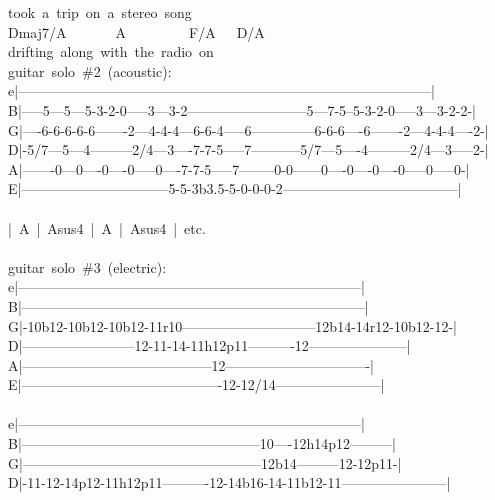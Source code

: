 {took\ a\ trip\ on\ a\ stereo\ song\\
Dmaj7/A\ \ \ \ \ \ \ A\ \ \ \ \ \ \ \ \ F/A\ \ \ D/A\\
drifting\ along\ with\ the\ radio\ on\\
guitar\ solo\ \#2\ (acoustic):\\
e|-----------------------------------------------------------------------------------------|\\
B|-----5---5---5-3-2-0-----3---3-2--------------------------5---7-5--5-3-2-0-----3---3-2-2-|\\
G|----6-6-6-6-6-------2---4-4-4---6-6-4-----6--------------6-6-6----6-------2---4-4-4----2-|\\
D|-5/7---5---4---------2/4---3----7-7-5-----7-----------5/7---5----4---------2/4---3-----2-|\\
A|-------0---0----0----0-----0----7-7-5-----7--------0-0------0----0----0----0-----0-----0-|\\
E|--------------------------------5-5-3b3.5-5-0-0-0-2--------------------------------------|\\
\\
|\ A\ |\ Asus4\ |\ A\ |\ Asus4\ |\ etc.\\
\\
guitar\ solo\ \#3\ (electric):\\
e|--------------------------------------------------------------------------|\\
B|--------------------------------------------------------------------------|\\
G|-10b12-10b12-10b12-11r10-----------------------------12b14-14r12-10b12-12-|\\
D|------------------------12-11-14-11h12p11----------12---------------------|\\
A|-----------------------------------------12-------------------------------|\\
E|-------------------------------------------12-12/14-----------------------|\\
\\
e|--------------------------------------------------------------------------|\\
B|---------------------------------------------------10----12h14p12---------|\\
G|---------------------------------------------------12b14---------12-12p11-|\\
D|-11-12-14p12-11h12p11----------12-14b16-14-11b12-11-----------------------|\\
}
